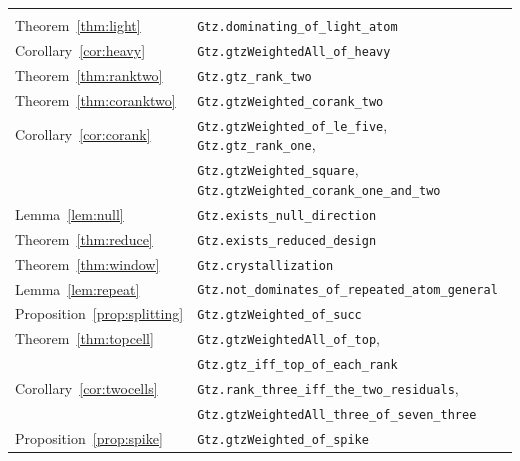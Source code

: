 {\begin{longtable}{@{}ll@{}}
\addlinespace
\multicolumn{2}{@{}l}{\emph{\S\ref{sec:real}, the decided real cells}}\\
Theorem~\ref{thm:light}        & \texttt{Gtz.dominating\_of\_light\_atom} \\
Corollary~\ref{cor:heavy}      & \texttt{Gtz.gtzWeightedAll\_of\_heavy} \\
Theorem~\ref{thm:ranktwo}      & \texttt{Gtz.gtz\_rank\_two} \\
Theorem~\ref{thm:coranktwo}    & \texttt{Gtz.gtzWeighted\_corank\_two} \\
Corollary~\ref{cor:corank}     & \texttt{Gtz.gtzWeighted\_of\_le\_five},
                                 \texttt{Gtz.gtz\_rank\_one}, \\
                               & \texttt{Gtz.gtzWeighted\_square},
                                 \texttt{Gtz.gtzWeighted\_corank\_one\_and\_two} \\
Lemma~\ref{lem:null}           & \texttt{Gtz.exists\_null\_direction} \\
Theorem~\ref{thm:reduce}       & \texttt{Gtz.exists\_reduced\_design} \\
Theorem~\ref{thm:window}       & \texttt{Gtz.crystallization} \\
Lemma~\ref{lem:repeat}         & \texttt{Gtz.not\_dominates\_of\_repeated\_atom\_general} \\
Proposition~\ref{prop:splitting}& \texttt{Gtz.gtzWeighted\_of\_succ} \\
Theorem~\ref{thm:topcell}      & \texttt{Gtz.gtzWeightedAll\_of\_top}, \\
                               & \texttt{Gtz.gtz\_iff\_top\_of\_each\_rank} \\
Corollary~\ref{cor:twocells}   & \texttt{Gtz.rank\_three\_iff\_the\_two\_residuals}, \\
                               & \texttt{Gtz.gtzWeightedAll\_three\_of\_seven\_three} \\
Proposition~\ref{prop:spike}   & \texttt{Gtz.gtzWeighted\_of\_spike}
\end{longtable}}

